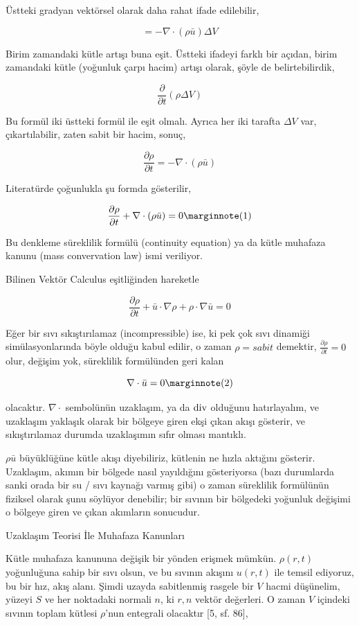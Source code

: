 \documentclass[12pt,fleqn]{article}\usepackage{../../common}
\begin{document}
Üstteki gradyan vektörsel olarak daha rahat ifade edilebilir,

$$
= -\nabla \cdot (\rho \bar{u} ) \Delta V
$$

Birim zamandaki kütle artışı buna eşit. Üstteki ifadeyi farklı bir açıdan, birim
zamandaki kütle (yoğunluk çarpı hacim) artışı olarak, şöyle de belirtebilirdik,

$$
\frac{\partial }{\partial t} (\rho \Delta V) 
$$

Bu formül iki üstteki formül ile eşit olmalı. Ayrıca her iki tarafta $\Delta V$
var, çıkartılabilir, zaten sabit bir hacim, sonuç,

$$
\frac{\partial \rho}{\partial t}  = -\nabla \cdot (\rho \bar{u} )
$$

Literatürde çoğunlukla şu formda gösterilir,

$$
\frac{\partial \rho}{\partial t}  + \nabla \cdot (\rho \bar{u} ) = 0
\mlabel{1}
$$

Bu denkleme süreklilik formülü (continuity equation) ya da kütle muhafaza kanunu
(mass convervation law) ismi veriliyor.

Bilinen Vektör Calculus eşitliğinden hareketle

$$
\frac{\partial \rho}{\partial t}  +
\bar{u} \cdot \nabla \rho +
\rho \cdot \nabla \bar{u} = 0
$$

Eğer bir sıvı sıkıştırılamaz (incompressible) ise, ki pek çok sıvı dinamiği
simülasyonlarında böyle olduğu kabul edilir, o zaman $\rho = sabit$ demektir,
$\frac{\partial \rho}{\partial t} = 0 $ olur, değişim yok, süreklilik
formülünden geri kalan

$$
\nabla \cdot \bar{u} = 0
\mlabel{2}
$$

olacaktır. $\nabla \cdot$ sembolünün uzaklaşım, ya da $\operatorname{div}$ olduğunu
hatırlayalım, ve uzaklaşım yaklaşık olarak bir bölgeye giren ekşi çıkan akışı
gösterir, ve sıkıştırılamaz durumda uzaklaşımın sıfır olması mantıklı.

$\rho \bar{u}$ büyüklüğüne kütle akışı diyebiliriz, kütlenin ne hızla aktığını
gösterir. Uzaklaşım, akımın bir bölgede nasıl yayıldığını gösteriyorsa (bazı
durumlarda sanki orada bir su / sıvı kaynağı varmış gibi) o zaman süreklilik
formülünün fiziksel olarak şunu söylüyor denebilir; bir sıvının bir bölgedeki
yoğunluk değişimi o bölgeye giren ve çıkan akımların sonucudur.

Uzaklaşım Teorisi İle Muhafaza Kanunları

Kütle muhafaza kanununa değişik bir yönden erişmek mümkün. $\rho(r, t)$
yoğunluğuna sahip bir sıvı olsun, ve bu sıvının akışını $u(r, t)$ ile temsil
ediyoruz, bu bir hız, akış alanı. Şimdi uzayda sabitlenmiş rasgele bir $V$ hacmi
düşünelim, yüzeyi $S$ ve her noktadaki normali $n$, ki $r,n$ vektör değerleri. O
zaman $V$ içindeki sıvının toplam kütlesi $\rho$'nun entegrali olacaktır [5, sf. 86],
\end{document}
